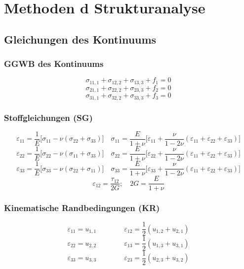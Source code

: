 \section{Methoden d Strukturanalyse}
    \subsection{Gleichungen des Kontinuums}
        \subsubsection{GGWB des Kontinuums}
            \small
            \[\sigma_{11,1} + \sigma_{12,2} + \sigma_{13,3} + f_1 = 0\]
            \[\sigma_{21,1} + \sigma_{22,2} + \sigma_{23,3} + f_2 = 0\]
            \[\sigma_{31,1} + \sigma_{32,2} + \sigma_{33,3} + f_3 = 0\]
            
        \subsubsection{Stoffgleichungen (SG)}
            \[\varepsilon_{11} = \frac{1}{E}\lbrack\sigma_{11} - \nu(\sigma_{22} + \sigma_{33})\rbrack \quad \sigma_{11}=\frac{E}{1+\nu}\lbrack\varepsilon_{11}+\frac{\nu}{1-2\nu}(\varepsilon_{11}+\varepsilon_{22}+\varepsilon_{33})\rbrack\]
            \[\varepsilon_{22} = \frac{1}{E}\lbrack\sigma_{22} - \nu(\sigma_{11} + \sigma_{33})\rbrack \quad \sigma_{22}=\frac{E}{1+\nu}\lbrack\varepsilon_{22}+\frac{\nu}{1-2\nu}(\varepsilon_{11}+\varepsilon_{22}+\varepsilon_{33})\rbrack\]
            \[\varepsilon_{33} = \frac{1}{E}\lbrack\sigma_{33} - \nu(\sigma_{22} + \sigma_{11})\rbrack \quad \sigma_{33}=\frac{E}{1+\nu}\lbrack\varepsilon_{33}+\frac{\nu}{1-2\nu}(\varepsilon_{11}+\varepsilon_{22}+\varepsilon_{33})\rbrack\]
            \[\varepsilon_{12}=\frac{\tau_{12}}{2G}; \quad 2G=\frac{E}{1+\nu}\]
            
        \subsubsection{Kinematische Randbedingungen (KR)}
            \[\varepsilon_{11} = u_{1,1}\quad\quad\quad\quad\varepsilon_{12} = \frac{1}{2}(u_{1,2} + u_{2,1})\]
            \[\varepsilon_{22} = u_{2,2}\quad\quad\quad\quad\varepsilon_{13} = \frac{1}{2}(u_{1,3} + u_{3,1})\]
            \[\varepsilon_{33} = u_{3,3}\quad\quad\quad\quad\varepsilon_{23} = \frac{1}{2}(u_{2,3} + u_{3,2})\]
            \normalsize
        
    